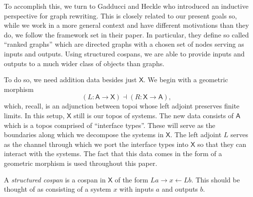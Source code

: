 \documentclass{amsart}
\newcommand{\A}{\cat{A}}
\newcommand{\X}{\cat{X}}
\newcommand{\cat}[1]{\mathsf{#1}}
\newcommand{\from}{\colon}
\renewcommand{\gets}{\leftarrow}
\theoremstyle{remark}
\theoremstyle{definition}
\begin{document}
To accomplish this, we turn to Gadducci and Heckle
\cite{Gadd_IndGraphTrans} who introduced an inductive perspective for
graph rewriting.  This is closely related to our present goals so,
while we work in a more general context and have different
motivations than they do, we follow the framework set in their
paper.  In particular, they define so called ``ranked graphs'' which
are directed graphs with a chosen set of nodes serving as inputs and
outputs.  Using structured cospans, we are able to provide inputs and
outputs to a much wider class of objects than graphs. 

To do so, we need addition data besides just $ \X $.  We begin with a
geometric morphism
%
\[
  ( L \from \A \to \X ) \dashv ( R \from \X \to \A ),
\]
% 
which, recall, is an adjunction between topoi whose left adjoint preserves finite
limits.  In this setup, $ \X $ still is our topos of systems.  The new
data consists of $ \A $ which is a topos comprised of ``interface
types''.  These will serve as the boundaries along which we decompose
the systems in $ \X $.  The left adjoint $ L $ serves as the channel
through which we port the interface types into $ \X $ so that they can
interact with the systems.  The fact that this data comes in the form
of a geometric morphism is used throughout this paper.

A \emph{structured cospan} is a cospan in $ \X $ of the form
$ La \to x \gets Lb $. This should be thought of as consisting of a
system $ x $ with inputs $ a $ and outputs $ b $.
\end{document}
